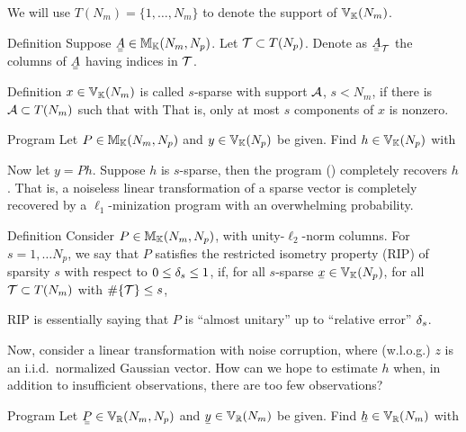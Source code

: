 We will use \(T (N_m) =\{1, \dotsc, N_m\}\) to denote the support of \(\mathbb{V}_{\mathbb{K}} (N_m)\).

\Result
{Definition}
{
Suppose \(\M{A} \in \MB{M}_{\MB{K}} (N_m, N_p)\).
Let \(\mathcal{T} \subset T (N_p)\).
Denote as \(\M{A}_{\MC{T}}\) the columns of \(\M{A}\) having indices in \(\mathcal{T}\).
}

\Result
{Definition}
{
\(x \in \mathbb{V}_{\mathbb{K}} (N_m)\) is called \(s\)-sparse with support \(\mathcal{A}\), \(s <N_m\), if there is \(\mathcal{A} \subset T (N_m)\) such that
%
with
That is, only at most \(s\) components of \(x\) is nonzero.
}

\Result
{Program}
{
Let \(P \in \mathbb{M}_{\mathbb{K}} (N_m, N_p)\) and \(y \in \mathbb{V}_{\mathbb{K}} (N_p)\) be given.
Find \(h \in \mathbb{V}_{\mathbb{K}} (N_p)\) with
%
}

Now let \(y =P h\).
Suppose \(h\) is \(s\)-sparse, then the program () completely recovers \(h\).
That is, a noiseless linear transformation of a sparse vector is completely recovered by a \(\ell_1\)-minization program with an overwhelming probability.

\Result
{Definition}
{
Consider \(P \in \mathbb{M}_{\mathbb{K}} (N_m, N_p)\), with unity-\(\ell_2\)-norm columns.
For \(s =1, \dotsc N_p\), we say that \(P\) satisfies the restricted isometry property (RIP) of sparsity \(s\) with respect to \(0 \leq \delta_s \leq 1\), if, for all \(s\)-sparse \(\V{x} \in \MB{V}_{\MB{K}} (N_p)\), for all \(\mathcal{T} \subset T(N_m)\) with \(\#\{\mathcal{T}\} \leq s\),
%
}

RIP is essentially saying that \(P\) is ``almost unitary'' up to ``relative error'' \(\delta_s\).

Now, consider a linear transformation with noise corruption,
%
%
where (w.l.o.g.) \(z\) is an i.i.d.\ normalized Gaussian vector.
How can we hope to estimate \(h\) when, in addition to insufficient observations, there are too few observations?

\Result
{Program}
{
Let \(\M{P} \in \MB{V}_\MB{R} (N_m, N_p)\) and \(\V{y} \in \MB{V}_\MB{R} (N_m)\) be given.
Find \(\V{h} \in \MB{V}_\MB{R} (N_m)\) with
%
}

